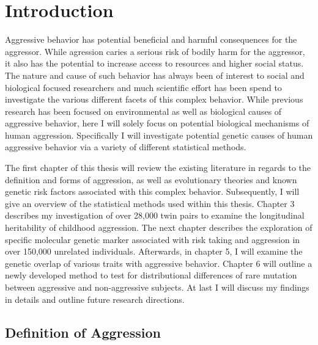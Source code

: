 \documentclass[../header.tex]{subfiles}
\begin{document}
\chapter{Introduction}
\label{cha:introduction}

Aggressive behavior has potential beneficial and harmful consequences for the aggressor.
While agression caries a serious risk of bodily harm for the aggressor, it also has the potential to increase access to resources and higher social status.
The nature and cause of such behavior has always been of interest to social and biological focused researchers and much scientific effort has been spend to investigate the various different facets of this complex behavior.
While previous research has been focused on environmental as well as biological causes of aggressive behavior, here I will solely focus on potential biological mechanisms of human aggression.
Specifically I will investigate potential genetic causes of human aggressive behavior via a variety of different statistical methods.

The first chapter of this thesis will review the existing literature in regards to the definition and forms of aggression, as well as evolutionary theories and known genetic risk factors associated with this complex behavior.
Subsequently, I will give an overview of the statistical methods used within this thesis.
Chapter 3 describes my investigation of over 28,000 twin pairs to examine the longitudinal heritability of childhood aggression.
The next chapter describes the exploration of specific molecular genetic marker associated with risk taking and aggression in over 150,000 unrelated individuals.
Afterwards, in chapter 5, I will examine the genetic overlap of various traits with aggressive behavior.
Chapter 6 will outline a newly developed method to test for distributional differences of rare mutation between aggressive and non-aggressive subjects.
At last I will discuss my findings in details and outline future research directions.

\section{Definition of Aggression}
\label{sec:overview_of_reseach_in_aggression}
\end{document}
